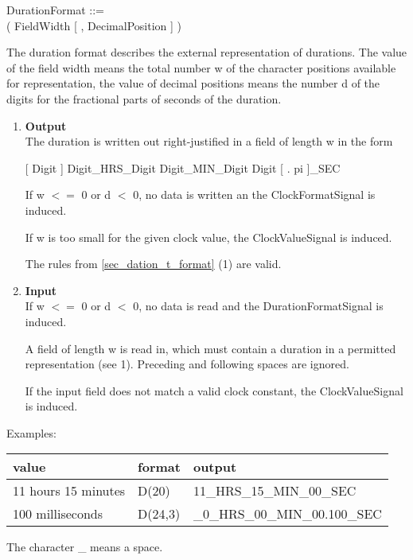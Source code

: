 DurationFormat ::=\\
 ( FieldWidth [ , DecimalPosition ] )

The duration format describes the external representation of durations.
The value of the field width means the total number w of the character
positions available for representation, the value of decimal positions
means the number d of the digits for the fractional parts of seconds of
the duration.
\begin{enumerate}
\item {\bf Output}\\
The duration is written out right-justified in a field of length w in
the form

[ Digit ] Digit\_HRS\_Digit Digit\_MIN\_Digit Digit [ . pi ]\_SEC

\begin{added}
If w $<=$ 0 or d $<$ 0, no data is written an the ClockFormatSignal
   is induced.

If w is too small for the given clock value, the ClockValueSignal
   is induced.
\end{added}

\begin{removed}
The rules from \ref{sec_dation_t_format} (1) are valid.
\end{removed}
\item {\bf Input}\\
If w $<=$ 0 or d $<$ 0, no data is read and the DurationFormatSignal
   is induced.

\begin{added}
A field of length w is read in, which must contain a duration in a
permitted representation (see 1). Preceding and following spaces are
ignored.

If the input field does not match a valid clock constant, the 
   ClockValueSignal is induced.
\end{added}
\end{enumerate}

Examples:

\begin{tabular}{lll}
value               & format  & output \\ \hline
11 hours 15 minutes & D(20)   & 11\_HRS\_15\_MIN\_00\_SEC \\
100 milliseconds    & D(24,3) & \_0\_HRS\_00\_MIN\_00.100\_SEC
\end{tabular}

The character \_ means a space.

